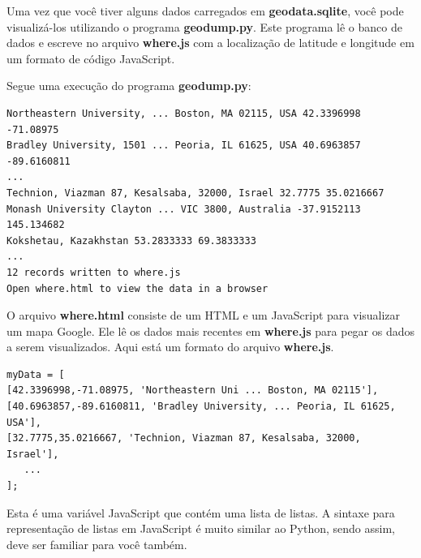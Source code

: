 Uma vez que você tiver alguns dados carregados em {\bf geodata.sqlite},
você pode visualizá-los utilizando o programa {\bf geodump.py}.
Este programa lê o banco de dados e escreve no arquivo {\bf where.js}
com a localização de latitude e longitude em um formato de código 
JavaScript.

Segue uma execução do programa {\bf geodump.py}:

\beforeverb
\begin{verbatim}
Northeastern University, ... Boston, MA 02115, USA 42.3396998 -71.08975
Bradley University, 1501 ... Peoria, IL 61625, USA 40.6963857 -89.6160811
...
Technion, Viazman 87, Kesalsaba, 32000, Israel 32.7775 35.0216667
Monash University Clayton ... VIC 3800, Australia -37.9152113 145.134682
Kokshetau, Kazakhstan 53.2833333 69.3833333
...
12 records written to where.js
Open where.html to view the data in a browser
\end{verbatim}
\afterverb
%

O arquivo {\bf where.html} consiste de um HTML e um JavaScript para visualizar
um mapa Google. Ele lê os dados mais recentes em {\bf where.js} para pegar
os dados a serem visualizados. Aqui está um formato do arquivo {\bf where.js}.

\beforeverb
\begin{verbatim}
myData = [
[42.3396998,-71.08975, 'Northeastern Uni ... Boston, MA 02115'],
[40.6963857,-89.6160811, 'Bradley University, ... Peoria, IL 61625, USA'],
[32.7775,35.0216667, 'Technion, Viazman 87, Kesalsaba, 32000, Israel'],
   ...
];
\end{verbatim}
\afterverb
%

Esta é uma variável JavaScript que contém uma lista de listas.
A sintaxe para representação de listas em JavaScript é muito similar
ao Python, sendo assim, deve ser familiar para você também.

